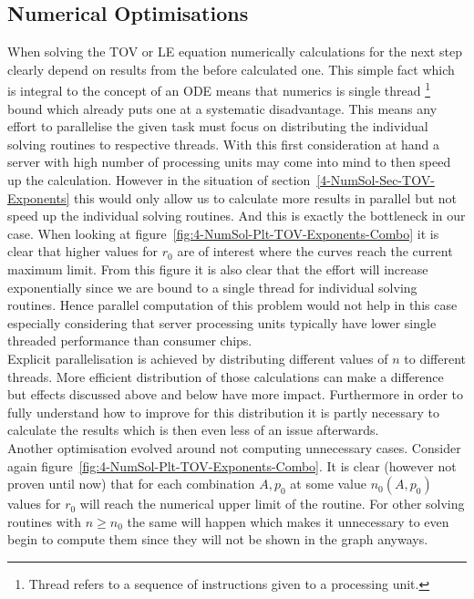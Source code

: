 \subsection{Numerical Optimisations}
\label{subsec:99-App-Numerical-Optimisations}
When solving the \ac{TOV} or \ac{LE} equation numerically calculations for the next step clearly depend on results from the before calculated one.
This simple fact which is integral to the concept of an \ac{ODE} means that numerics is single thread \footnote{Thread refers to a sequence of instructions given to a processing unit.} bound which already puts one at a systematic disadvantage.
This means any effort to parallelise the given task must focus on distributing the individual solving routines to respective threads.
With this first consideration at hand a server with high number of processing units may come into mind to then speed up the calculation.
However in the situation of section~\ref{4-NumSol-Sec-TOV-Exponents} this would only allow us to calculate more results in parallel but not speed up the individual solving routines.
And this is exactly the bottleneck in our case.
When looking at figure~\ref{fig:4-NumSol-Plt-TOV-Exponents-Combo} it is clear that higher values for $r_0$ are of interest where the curves reach the current maximum limit.
From this figure it is also clear that the effort will increase exponentially since we are bound to a single thread for individual solving routines.
Hence parallel computation of this problem would not help in this case especially considering that server processing units typically have lower single threaded performance than consumer chips.\\
Explicit parallelisation is achieved by distributing different values of $n$ to different threads.
More efficient distribution of those calculations can make a difference but effects discussed above and below have more impact.
Furthermore in order to fully understand how to improve for this distribution it is partly necessary to calculate the results which is then even less of an issue afterwards.\\
Another optimisation evolved around not computing unnecessary cases.
Consider again figure~\ref{fig:4-NumSol-Plt-TOV-Exponents-Combo}.
It is clear (however not proven until now) that for each combination $A,p_0$ at some value $n_0(A,p_0)$ values for $r_0$ will reach the numerical upper limit of the routine.
For other solving routines with $n\geq n_0$ the same will happen which makes it unnecessary to even begin to compute them since they will not be shown in the graph anyways.
